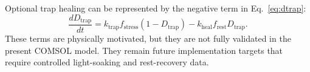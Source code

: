 Optional trap healing can be represented by the negative term in
Eq.~\ref{eq:dtrap}:
\begin{equation}
\frac{dD_{\mathrm{trap}}}{dt}
= k_{\mathrm{trap}}f_{\mathrm{stress}}
\left(1-D_{\mathrm{trap}}\right)
- k_{\mathrm{heal}}f_{\mathrm{rest}}D_{\mathrm{trap}}.
\end{equation}
These terms are physically motivated, but they are not fully validated in the
present COMSOL model. They remain future implementation targets that require
controlled light-soaking and rest-recovery data.
